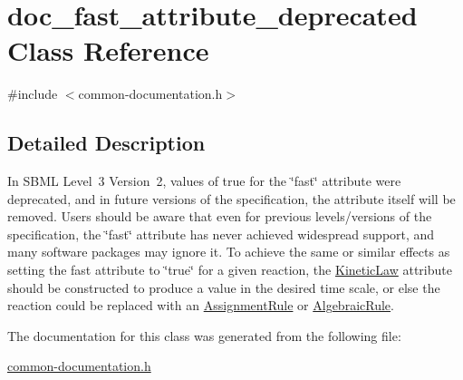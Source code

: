 \hypertarget{classdoc__fast__attribute__deprecated}{}\section{doc\+\_\+fast\+\_\+attribute\+\_\+deprecated Class Reference}
\label{classdoc__fast__attribute__deprecated}


{\ttfamily \#include $<$common-\/documentation.\+h$>$}



\subsection{Detailed Description}
\begin{DoxyParagraph}{}
In S\+B\+ML Level~3 Version~2, values of {\ttfamily true} for the \char`\"{}fast\char`\"{} attribute were deprecated, and in future versions of the specification, the attribute itself will be removed. Users should be aware that even for previous levels/versions of the specification, the \char`\"{}fast\char`\"{} attribute has never achieved widespread support, and many software packages may ignore it. To achieve the same or similar effects as setting the fast attribute to \char`\"{}true\char`\"{} for a given reaction, the \hyperlink{class_kinetic_law}{Kinetic\+Law} attribute should be constructed to produce a value in the desired time scale, or else the reaction could be replaced with an \hyperlink{class_assignment_rule}{Assignment\+Rule} or \hyperlink{class_algebraic_rule}{Algebraic\+Rule}. 
\end{DoxyParagraph}


The documentation for this class was generated from the following file\+:\begin{DoxyCompactItemize}
\item 
\hyperlink{common-documentation_8h}{common-\/documentation.\+h}\end{DoxyCompactItemize}
